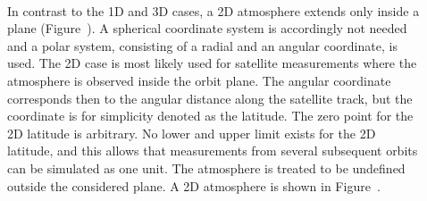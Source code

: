 \begin{description}
\item[\,\,\,] In contrast to the 1D and 3D cases, a 2D
  atmosphere extends only inside a plane
  (Figure~). A spherical coordinate system is
  accordingly not needed and a polar system, consisting of a radial and an angular coordinate, is
  used. The 2D case is most likely used for satellite measurements
  where the atmosphere is observed inside the orbit plane. The angular
  coordinate corresponds then to the angular distance along the
  satellite track, but the coordinate is for simplicity denoted as the
  latitude. The zero point for the 2D latitude is arbitrary. No lower
  and upper limit exists for the 2D latitude, and this allows that
  measurements from several subsequent orbits can be simulated as one
  unit. The atmosphere is treated to be undefined outside the
  considered plane. A 2D atmosphere is shown in
  Figure~.

\end{description}

